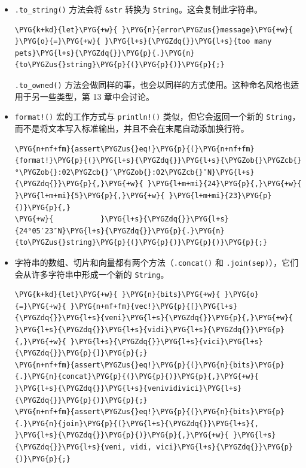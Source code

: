 \begin{itemize}
\item \texttt{.to\_string()} 方法会将 \texttt{\&str} 转换为 \texttt{String}。这会复制此字符串。

\begin{Verbatim}[commandchars=\\\{\},breaklines=true,breakanywhere=true,fontsize=\codefont,xleftmargin=17bp]
\PYG{k+kd}{let}\PYG{+w}{ }\PYG{n}{error\PYGZus{}message}\PYG{+w}{ }\PYG{o}{=}\PYG{+w}{ }\PYG{l+s}{\PYGZdq{}}\PYG{l+s}{too many pets}\PYG{l+s}{\PYGZdq{}}\PYG{p}{.}\PYG{n}{to\PYGZus{}string}\PYG{p}{(}\PYG{p}{)}\PYG{p}{;}
\end{Verbatim}

\texttt{.to\_owned()} 方法会做同样的事，也会以同样的方式使用。这种命名风格也适用于另一些类型，第 13 章中会讨论。
\item \texttt{format!()} 宏的工作方式与 \texttt{println!()} 类似，但它会返回一个新的 \texttt{String}，而不是将文本写入标准输出，并且不会在末尾自动添加换行符。

\begin{Verbatim}[commandchars=\\\{\},breaklines=true,breakanywhere=true,fontsize=\codefont,xleftmargin=17bp]
\PYG{n+nf+fm}{assert\PYGZus{}eq!}\PYG{p}{(}\PYG{n+nf+fm}{format!}\PYG{p}{(}\PYG{l+s}{\PYGZdq{}}\PYG{l+s}{\PYGZob{}\PYGZcb{}°\PYGZob{}:02\PYGZcb{}′\PYGZob{}:02\PYGZcb{}″N}\PYG{l+s}{\PYGZdq{}}\PYG{p}{,}\PYG{+w}{ }\PYG{l+m+mi}{24}\PYG{p}{,}\PYG{+w}{ }\PYG{l+m+mi}{5}\PYG{p}{,}\PYG{+w}{ }\PYG{l+m+mi}{23}\PYG{p}{)}\PYG{p}{,}
\PYG{+w}{           }\PYG{l+s}{\PYGZdq{}}\PYG{l+s}{24°05′23″N}\PYG{l+s}{\PYGZdq{}}\PYG{p}{.}\PYG{n}{to\PYGZus{}string}\PYG{p}{(}\PYG{p}{)}\PYG{p}{)}\PYG{p}{;}
\end{Verbatim}

\item 字符串的数组、切片和向量都有两个方法（\texttt{.concat()} 和 \texttt{.join(sep)}），它们会从许多字符串中形成一个新的 \texttt{String}。

\begin{Verbatim}[commandchars=\\\{\},breaklines=true,breakanywhere=true,fontsize=\codefont,xleftmargin=17bp]
\PYG{k+kd}{let}\PYG{+w}{ }\PYG{n}{bits}\PYG{+w}{ }\PYG{o}{=}\PYG{+w}{ }\PYG{n+nf+fm}{vec!}\PYG{p}{[}\PYG{l+s}{\PYGZdq{}}\PYG{l+s}{veni}\PYG{l+s}{\PYGZdq{}}\PYG{p}{,}\PYG{+w}{ }\PYG{l+s}{\PYGZdq{}}\PYG{l+s}{vidi}\PYG{l+s}{\PYGZdq{}}\PYG{p}{,}\PYG{+w}{ }\PYG{l+s}{\PYGZdq{}}\PYG{l+s}{vici}\PYG{l+s}{\PYGZdq{}}\PYG{p}{]}\PYG{p}{;}
\PYG{n+nf+fm}{assert\PYGZus{}eq!}\PYG{p}{(}\PYG{n}{bits}\PYG{p}{.}\PYG{n}{concat}\PYG{p}{(}\PYG{p}{)}\PYG{p}{,}\PYG{+w}{ }\PYG{l+s}{\PYGZdq{}}\PYG{l+s}{venividivici}\PYG{l+s}{\PYGZdq{}}\PYG{p}{)}\PYG{p}{;}
\PYG{n+nf+fm}{assert\PYGZus{}eq!}\PYG{p}{(}\PYG{n}{bits}\PYG{p}{.}\PYG{n}{join}\PYG{p}{(}\PYG{l+s}{\PYGZdq{}}\PYG{l+s}{, }\PYG{l+s}{\PYGZdq{}}\PYG{p}{)}\PYG{p}{,}\PYG{+w}{ }\PYG{l+s}{\PYGZdq{}}\PYG{l+s}{veni, vidi, vici}\PYG{l+s}{\PYGZdq{}}\PYG{p}{)}\PYG{p}{;}
\end{Verbatim}

\end{itemize}

